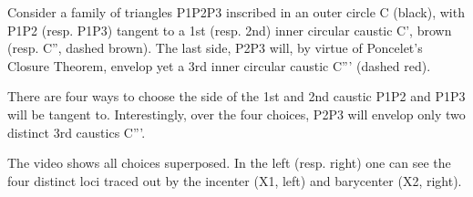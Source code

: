 Consider a family of triangles P1P2P3 inscribed in an outer circle C (black), with P1P2 (resp. P1P3) tangent to a 1st (resp. 2nd) inner circular caustic C', brown (resp. C'', dashed brown). The last side, P2P3 will, by virtue of Poncelet's Closure Theorem, envelop yet a 3rd inner circular caustic C''' (dashed red).

There are four ways to choose the side of the 1st and 2nd caustic P1P2 and P1P3 will be tangent to. Interestingly, over the four choices, P2P3 will envelop only two distinct 3rd caustics C'''.

The video shows all choices superposed. In the left (resp. right) one can see the four distinct loci traced out by the incenter (X1, left) and barycenter (X2, right).